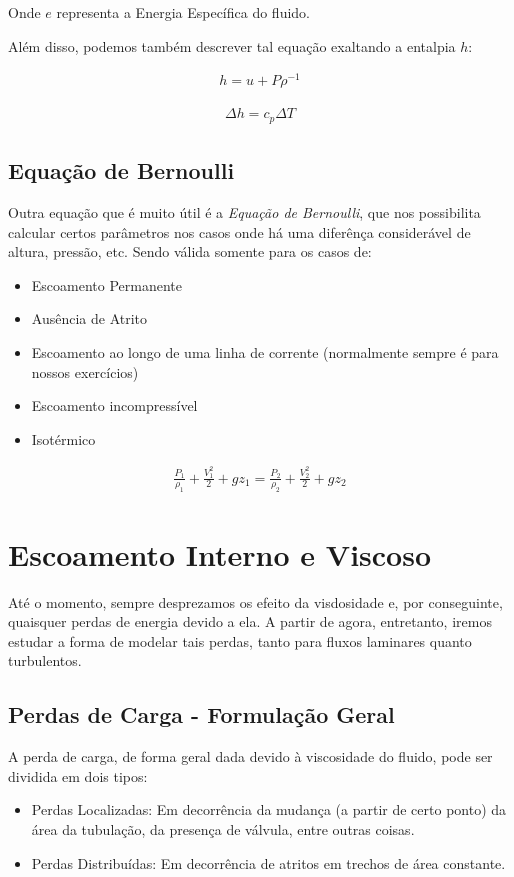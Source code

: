 \documentclass{article}
\begin{document}
Onde $e$ representa a Energia Específica do fluido.

Além disso, podemos também descrever tal equação exaltando a entalpia $h$:

\begin{minipage}{.5\textwidth}
    \begin{align*}
        h = u + P \rho^{-1}
    \end{align*}
\end{minipage}
\begin{minipage}{.5\textwidth}
    \begin{align*}
        \Delta h = c_p \Delta T
    \end{align*}
\end{minipage}

\subsection{Equação de Bernoulli}
Outra equação que é muito útil é a \emph{Equação de Bernoulli}, que nos possibilita calcular certos parâmetros nos casos onde há uma diferênça considerável de altura, pressão, etc. Sendo válida somente para os casos de:
\begin{itemize}
    \item Escoamento Permanente
    \item Ausência de Atrito
    \item Escoamento ao longo de uma linha de corrente (normalmente sempre é para nossos exercícios)
    \item Escoamento incompressível
    \item Isotérmico
\end{itemize}

\begin{align}
    \frac{P_1}{\rho_1} + \frac{V^2_1}{2} + gz_1 = \frac{P_2}{\rho_2} + \frac{V^2_2}{2} + gz_2
\end{align}

\newpage
\section{Escoamento Interno e Viscoso}
Até o momento, sempre desprezamos os efeito da visdosidade e, por conseguinte, quaisquer perdas de energia devido a ela. A partir de agora, entretanto, iremos estudar a forma de modelar tais perdas, tanto para fluxos laminares quanto turbulentos.

\subsection{Perdas de Carga - Formulação Geral}
A perda de carga, de forma geral dada devido à viscosidade do fluido, pode ser dividida em dois tipos:
\begin{itemize}
    \item Perdas Localizadas: Em decorrência da mudança (a partir de certo ponto) da área da tubulação, da presença de válvula, entre outras coisas.
    \item Perdas Distribuídas: Em decorrência de atritos em trechos de área constante.
\end{itemize}
\end{document}

